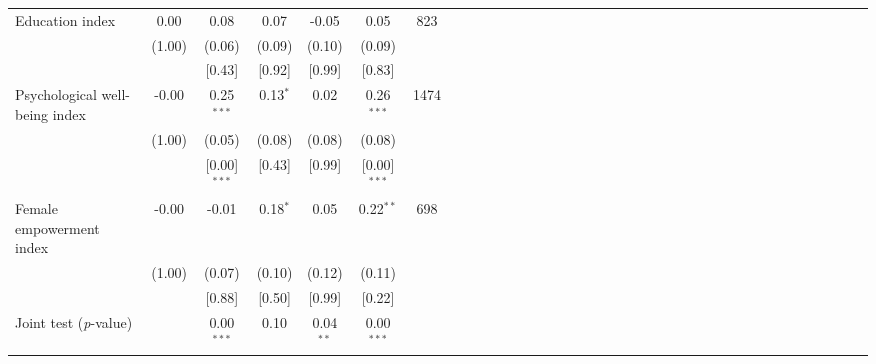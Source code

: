 {\begin{tabular}{l*{6}{SSSSSc}}
Education index&     0.00&     0.08&     0.07&    -0.05&     0.05&      823\\
          &   (1.00)&   (0.06)&   (0.09)&   (0.10)&   (0.09)&         \\
          &         &   [0.43]&   [0.92]&   [0.99]&   [0.83]&         \\
Psychological well-being index&    -0.00&0.25$^{***}$&0.13$^{*}$&     0.02&0.26$^{***}$&     1474\\
          &   (1.00)&   (0.05)&   (0.08)&   (0.08)&   (0.08)&         \\
          &         &[0.00]$^{***}$&   [0.43]&   [0.99]&[0.00]$^{***}$&         \\
Female empowerment index&    -0.00&    -0.01&0.18$^{*}$&     0.05&0.22$^{**}$&      698\\
          &   (1.00)&   (0.07)&   (0.10)&   (0.12)&   (0.11)&         \\
          &         &   [0.88]&   [0.50]&   [0.99]&   [0.22]&         \\
\midrule Joint test (\emph{p}-value)&         &0.00$^{***}$&     0.10&0.04$^{**}$&0.00$^{***}$&         \\
\bottomrule
\end{tabular}
}
